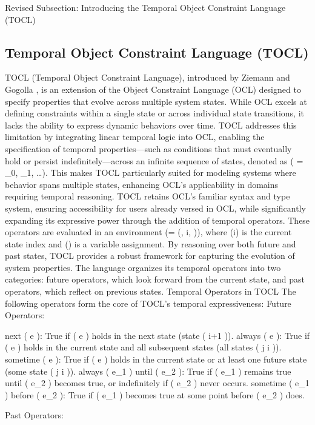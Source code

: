 Revised Subsection: Introducing the Temporal Object Constraint Language (TOCL)
\subsection{Temporal Object Constraint Language (TOCL)}
TOCL (Temporal Object Constraint Language), introduced by Ziemann and Gogolla \cite{TOCL}, is an extension of the Object Constraint Language (OCL) designed to specify properties that evolve across multiple system states. While OCL excels at defining constraints within a single state or across individual state transitions, it lacks the ability to express dynamic behaviors over time. TOCL addresses this limitation by integrating linear temporal logic into OCL, enabling the specification of temporal properties—such as conditions that must eventually hold or persist indefinitely—across an infinite sequence of states, denoted as (\hat{\sigma} = \langle \sigma_0, \sigma_1, \ldots \rangle). This makes TOCL particularly suited for modeling systems where behavior spans multiple states, enhancing OCL’s applicability in domains requiring temporal reasoning.
TOCL retains OCL’s familiar syntax and type system, ensuring accessibility for users already versed in OCL, while significantly expanding its expressive power through the addition of temporal operators. These operators are evaluated in an environment (\tau = (\hat{\sigma}, i, \beta)), where (i) is the current state index and (\beta) is a variable assignment. By reasoning over both future and past states, TOCL provides a robust framework for capturing the evolution of system properties. The language organizes its temporal operators into two categories: future operators, which look forward from the current state, and past operators, which reflect on previous states.
Temporal Operators in TOCL
The following operators form the core of TOCL’s temporal expressiveness:
Future Operators:

next ( e ): True if ( e ) holds in the next state (state ( i+1 )).
always ( e ): True if ( e ) holds in the current state and all subsequent states (all states ( j \geq i )).
sometime ( e ): True if ( e ) holds in the current state or at least one future state (some state ( j \geq i )).
always ( e_1 ) until ( e_2 ): True if ( e_1 ) remains true until ( e_2 ) becomes true, or indefinitely if ( e_2 ) never occurs.
sometime ( e_1 ) before ( e_2 ): True if ( e_1 ) becomes true at some point before ( e_2 ) does.

Past Operators:


